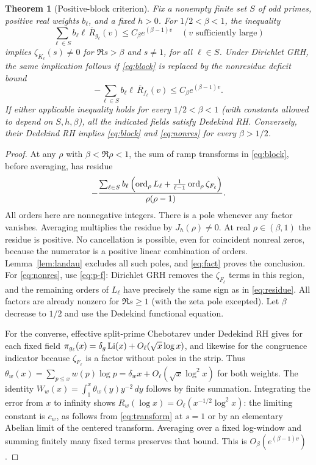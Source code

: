 \documentclass[11pt,letterpaper]{article}
\newtheorem{theorem}{Theorem}[section]\newtheorem{lemma}[theorem]{Lemma}\newtheorem{proposition}[theorem]{Proposition}\newtheorem{corollary}[theorem]{Corollary}
\theoremstyle{definition}\newtheorem{definition}[theorem]{Definition}
\theoremstyle{remark}\newtheorem{remark}[theorem]{Remark}
\begin{document}
\begin{theorem}[Positive-block criterion]\label{thm:block}
Fix a nonempty finite set $S$ of odd primes, positive real weights $b_\ell$, and a fixed $h>0$. For $1/2<\beta<1$, the inequality
\begin{equation}\label{eq:block}
\sum_{\ell\in S} b_\ell\ell\,\overline R_{g_\ell}(v)\le C_\beta e^{(\beta-1)v}\quad(v\text{ sufficiently large})
\end{equation}
implies $\zeta_{K_\ell}(s)\ne0$ for $\Re s>\beta$ and $s\ne1$, for all $\ell\in S$. Under Dirichlet GRH, the same implication follows if \eqref{eq:block} is replaced by the nonresidue deficit bound
\begin{equation}\label{eq:nonres}
-\sum_{\ell\in S} b_\ell\ell\,\overline R_{f_\ell}(v)\le C_\beta e^{(\beta-1)v}.
\end{equation}
If either applicable inequality holds for every $1/2<\beta<1$ (with constants allowed to depend on $S,h,\beta$), all the indicated fields satisfy Dedekind RH. Conversely, their Dedekind RH implies \eqref{eq:block} and \eqref{eq:nonres} for every $\beta>1/2$.
\end{theorem}
\begin{proof}
At any $\rho$ with $\beta<\Re\rho<1$, the sum of ramp transforms in \eqref{eq:block}, before averaging, has residue
\begin{equation}\label{eq:residue}
-\frac{\sum_{\ell\in S} b_\ell\left(\operatorname{ord}_\rho L_\ell+\frac1{\ell-1}\operatorname{ord}_\rho\zeta_{F_\ell}\right)}{\rho(\rho-1)}.
\end{equation}
All orders here are nonnegative integers. There is a pole whenever any factor vanishes. Averaging multiplies the residue by $J_h(\rho)\ne0$. At real $\rho\in(\beta,1)$ the residue is positive. No cancellation is possible, even for coincident nonreal zeros, because the numerator is a positive linear combination of orders. Lemma~\ref{lem:landau} excludes all such poles, and \eqref{eq:fact} proves the conclusion. For \eqref{eq:nonres}, use \eqref{eq:p-f}: Dirichlet GRH removes the $\zeta_{F_\ell}$ terms in this region, and the remaining orders of $L_\ell$ have precisely the same sign as in \eqref{eq:residue}. All factors are already nonzero for $\Re s\ge1$ (with the zeta pole excepted). Let $\beta$ decrease to $1/2$ and use the Dedekind functional equation.

For the converse, effective split-prime Chebotarev under Dedekind RH gives for each fixed field $\pi_{g_\ell}(x)=\delta_g\operatorname{Li}(x)+O_\ell(\sqrt{x}\log x)$, and likewise for the congruence indicator because $\zeta_{F_\ell}$ is a factor without poles in the strip. Thus $\theta_w(x)=\sum_{p\le x}w(p)\log p=\delta_w x+O_\ell(\sqrt{x}\log^2 x)$ for both weights. The identity $W_w(x)=\int_1^x\theta_w(y)y^{-2}\,dy$ follows by finite summation. Integrating the error from $x$ to infinity shows $R_w(\log x)=O_\ell(x^{-1/2}\log^2 x)$: the limiting constant is $c_w$, as follows from \eqref{eq:transform} at $s=1$ or by an elementary Abelian limit of the centered transform. Averaging over a fixed log-window and summing finitely many fixed terms preserves that bound. This is $O_\beta(e^{(\beta-1)v})$.
\end{proof}
\end{document}
